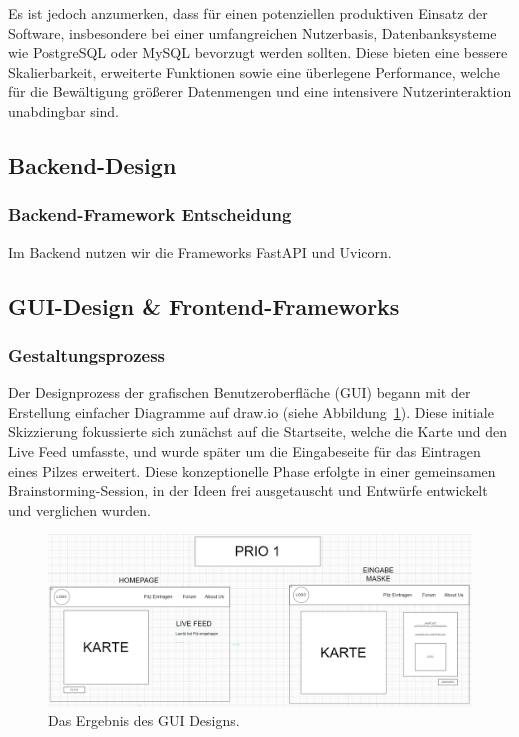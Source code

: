 \documentclass[../main.tex]{subfiles} %
\begin{document}
Es ist jedoch anzumerken, dass für einen potenziellen produktiven Einsatz der Software, insbesondere bei einer umfangreichen Nutzerbasis, Datenbanksysteme wie PostgreSQL oder MySQL bevorzugt werden sollten. 
Diese bieten eine bessere Skalierbarkeit, erweiterte Funktionen sowie eine überlegene Performance, welche für die Bewältigung größerer Datenmengen und eine intensivere Nutzerinteraktion unabdingbar sind.

\subsection{Backend-Design} %



\subsubsection{Backend-Framework Entscheidung}

Im Backend nutzen wir die Frameworks FastAPI und Uvicorn.

\subsection{GUI-Design \& Frontend-Frameworks} %

\subsubsection{Gestaltungsprozess}

Der Designprozess der grafischen Benutzeroberfläche (GUI) begann mit der Erstellung einfacher Diagramme auf draw.io
(siehe Abbildung~\ref{fig:GUI_Entwurf}). Diese initiale Skizzierung fokussierte sich zunächst auf die Startseite, welche
die Karte und den Live Feed umfasste, und wurde später um die Eingabeseite für das Eintragen eines Pilzes erweitert. Diese
konzeptionelle Phase erfolgte in einer gemeinsamen Brainstorming-Session, in der Ideen frei ausgetauscht und Entwürfe
entwickelt und verglichen wurden.

\begin{figure}[htbp]
	\centering
	\includegraphics[width=\textwidth]{../abbildungen/GUI_Entwurf_Drawio.jpg}
	\caption{Das Ergebnis des GUI Designs.}\label{fig:GUI_Entwurf}
\end{figure}
\end{document}
